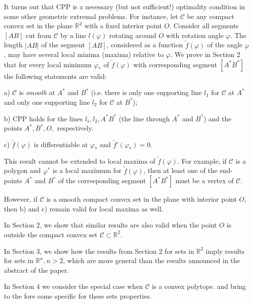 \documentclass[a4paper,12pt]{amsart}
\begin{document}
 \medskip

It turns out that CPP is a necessary (but not sufficient!) optimality condition in some other geometric extremal problems.
 For instance,  let $\mathcal{C}$ be any compact convex set in the plane $\mathbb{R}^2$ with a fixed interior point $O$.
 Consider all segments $[AB]$ cut from $\mathcal{C}$ by a line $l(\varphi)$ rotating around $O$ with rotation angle $\varphi$.
 The length $|AB|$ of the segment $[AB]$, considered as a function $\tilde{f}(\varphi)$ of the angle
  $\varphi$, may have several local minima (maxima) relative to $\varphi$.
  We prove in Section 2 that for every  local minimum $\varphi_*$ of $\tilde{f}(\varphi)$ with  corresponding segment $[A^*B^*]$ the following statements are valid:

a) $\mathcal{C}$ is \emph{smooth} at $A^*$ and $B^*$ (i.e. there is only one supporting line $l_1$ for $\mathcal{C}$ at $A^*$ and only one supporting line $l_2$ for $\mathcal{C}$ at $B^*$);

b) CPP holds for the lines $l_1, l_2,
A^*B^*$ (the line through $A^*$ and $B^*$)
and the points $A^*,
B^*, O ,$ respectively.

c) $\tilde{f}(\varphi)$ is differentiable at $\varphi_*$ and $\tilde{f}'(\varphi_*)=0$.

\smallskip
This result cannot be extended to local maxima of
$\tilde{f}(\varphi)$. For example, if $\mathcal{C}$ is a polygon
and $\varphi^*$ is a local maximum for $\tilde{f}(\varphi)$, then
at least one of the end-points $A^*$ and $B^*$ of the
corresponding segment $[A^*B^*]$ must be a vertex of
$\mathcal{C}$.

However, if $\mathcal{C}$ is a smooth compact convex set in the plane with interior point $O$, then b) and c) remain valid for local maxima as well.
 \medskip

In Section 2, we show that similar results are also valid when the point $O$ is outside the compact convex set $\mathcal{C} \subset \mathbb{R}^2$.

In Section 3, we show how the results from Section 2 for sets in $ \mathbb{R}^2$ imply results for sets in $\mathbb{R}^n, n >2$, which are more general than the results announced in the abstract of the paper.

\medskip

In Section 4 we consider the special case when $\mathcal{C}$ is a
convex polytope. and bring to the fore some specific for these
sets properties.
\medskip
\end{document}
